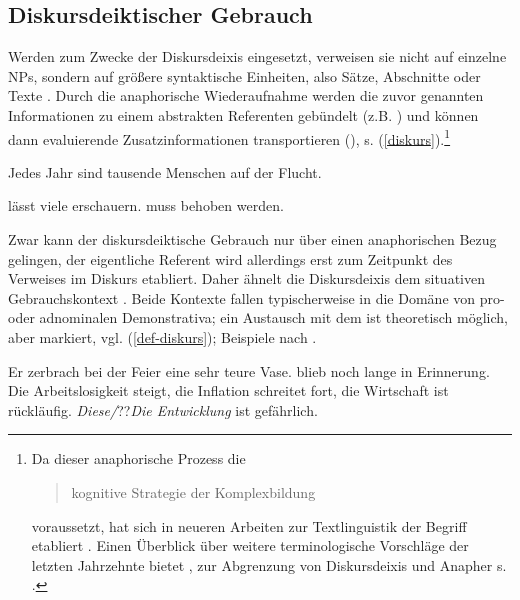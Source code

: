\subsection{Diskursdeiktischer Gebrauch}\label{diskurs-deikt}

Werden  zum Zwecke der Diskursdeixis  eingesetzt, verweisen sie nicht auf einzelne  NPs, sondern auf größere syntaktische Einheiten, also Sätze, Abschnitte oder Texte \parencite{Webber1991,Fraurud1992, Fillmore1997, Diessel1999, Consten2007, Consten2009, Marx2011}. Durch die anaphorische  Wiederaufnahme werden die zuvor genannten Informationen zu einem abstrakten Referenten gebündelt (z.B. ) und können dann evaluierende Zusatzinformationen transportieren (),  s. (\ref{diskurs}).\footnote{Da dieser anaphorische  Prozess die \blockcquote[129]{Schwarz2000}{kognitive Strategie der Komplexbildung} voraussetzt, hat sich in neueren Arbeiten zur Textlinguistik der Begriff  etabliert \parencite[s. z.b.][]{Consten2007, Consten2009}. Einen Überblick über weitere terminologische Vorschläge der letzten Jahrzehnte bietet \textcite[16--17]{Marx2011}, zur Abgrenzung von Diskursdeixis  und Anapher  s. \textcite[30--31]{Consten2004}.} 

 \begin{exe}
	\ex \label{diskurs}  Jedes Jahr sind tausende Menschen auf der Flucht.
	\begin{xlist}
		\ex \label{propo}  lässt viele erschauern.
			\ex \label{bewertung}  muss behoben werden.
		\end{xlist}
\end{exe}

Zwar kann der diskursdeiktische Gebrauch nur über einen anaphorischen  Bezug gelingen, der eigentliche Referent wird allerdings erst zum Zeitpunkt des Verweises im Diskurs etabliert. Daher ähnelt die Diskursdeixis dem situativen  Gebrauchskontext \parencite[224]{Himmelmann1996}. Beide Kontexte fallen typischerweise in die Domäne von pro- oder adnominalen Demonstrativa; ein Austausch mit dem  ist theoretisch möglich, aber markiert, vgl. (\ref{def-diskurs}); Beispiele nach  \textcite[130--131]{Schwarz2000}.  

 \begin{exe}
	\ex \label{def-diskurs} 
	\begin{xlist}
		\ex \label{ex:tassen} Er zerbrach bei der Feier eine sehr teure Vase.  blieb noch lange in Erinnerung. 
			\ex \label{ex:entwicklung} Die Arbeitslosigkeit steigt, die Inflation schreitet fort, die Wirtschaft ist rückläufig. \textit{Diese/}??\textit{Die Entwicklung} ist gefährlich. 
		\end{xlist}
\end{exe}

